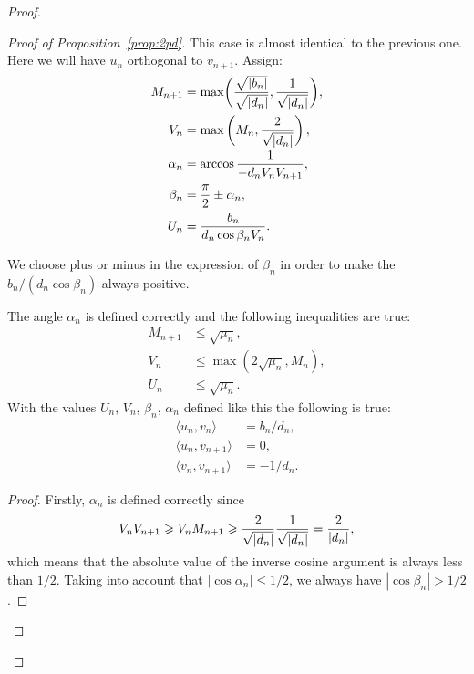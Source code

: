 \begin{proof}
\begin{proof}[Proof of Proposition~\ref{prop:2pd}]
          This case is almost identical to the previous one.
          Here we will have $u_n$ orthogonal to $v_{n+1}$.
          Assign:
          \begin{align*}
            M_{n+1} &= \max\biggl(\smash[t]{\frac{\sqrt{|b_n|}}{\sqrt{|d_n|}}}, \frac{1}{\sqrt{\smash[b]{|d_n|}}}\biggr),\\
            V_n &= \max\left(M_n, \frac{2}{\sqrt{\smash[b]{|d_n|}}}\right),\\
            \alpha_n &= \arccos{\frac{1}{-d_n V_n V_{n+1}}},\\
            \beta_n &= \frac{\pi}{2} \pm \alpha_n,\\
            U_n &= \frac{b_n}{d_n \cos{\beta_n} V_n}.
          \end{align*}
          \begin{remark*}
            We choose plus or minus in the expression of $\beta_n$ in order to make the $b_n/(d_n \cos{\beta_n})$ always positive.
          \end{remark*}
          \begin{prop}
            \label{prop:case3}
              The angle $\alpha_n$ is defined correctly and the following inequalities are true:
              \begin{align*}
                M_{n+1} &\leq \sqrt{\mu_n},\\
                V_n &\leq \max(2\sqrt{\mu_n}, M_n),\\
                U_n &\leq \sqrt{\mu_n}.
              \end{align*}
              With the values $U_n$, $V_n$, $\beta_n$, $\alpha_n$ defined like this the following is true:
              \begin{equation}
                \label{eqn:case3}
                \begin{aligned}
                  \langle u_n, v_n \rangle &= b_n/d_n,\\
                  \langle u_n, v_{n+1} \rangle &= 0,\\
                  \langle v_n, v_{n+1} \rangle &= -1/d_n.
                \end{aligned}
              \end{equation}
          \end{prop}
          \begin{proof}
            Firstly, $\alpha_n$ is defined correctly since
            \[
              V_n V_{n+1} \geq V_n M_{n+1} \geq \frac{2}{\sqrt{\smash[b]{|d_n|}}} \frac{1}{\sqrt{\smash[b]{|d_n|}}} = \frac{2}{|d_n|},
            \]
              which means that the absolute value of the inverse cosine argument is always less than $1/2$.
            Taking into account that $|\cos{\alpha_n}| \leq 1/2$, we always have $|\cos{\beta_n}| > 1/2$.


\end{proof}
\end{proof}
\end{proof}

